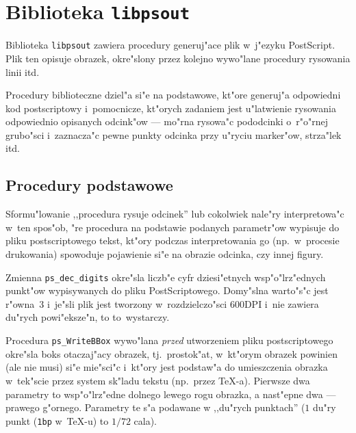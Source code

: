 

\chapter{Biblioteka \texttt{libpsout}}

Biblioteka \texttt{libpsout} zawiera procedury generuj"ace plik
w~j"ezyku PostScript\raisebox{3pt}{\tiny(TM)}. Plik ten opisuje
obrazek, okre"slony przez kolejno wywo"lane procedury rysowania linii itd.

Procedury biblioteczne dziel"a si"e na podstawowe, kt"ore generuj"a
odpowiedni kod postscriptowy i~pomocnicze, kt"orych zadaniem jest u"latwienie
rysowania odpowiednio opisanych odcink"ow --- mo"rna rysowa"c pododcinki
o~r"o"rnej grubo"sci i~zaznacza"c pewne punkty odcinka przy u"ryciu
marker"ow, strza"lek itd.


\section{Procedury podstawowe}

Sformu"lowanie ,,procedura rysuje odcinek'' lub cokolwiek nale"ry
interpretowa"c w~ten spos"ob, "re procedura na podstawie podanych
parametr"ow wypisuje do pliku postscriptowego tekst, kt"ory podczas
interpretowania go (np.\ w~procesie drukowania) spowoduje pojawienie si"e na
obrazie odcinka, czy innej figury.

\vspace{\bigskipamount}
Zmienna \texttt{ps\_dec\_digits} okre"sla liczb"e cyfr
dziesi"etnych wsp"o"lrz"ednych punkt"ow wypisywanych do pliku
PostScriptowego. Domy"slna warto"s"c jest r"owna~$3$ i~je"sli plik jest
tworzony w~rozdzielczo"sci $600$DPI i~nie zawiera du"rych powi"eksze"n, to
to~wystarczy.

\vspace{\bigskipamount}
Procedura \texttt{ps\_WriteBBox} wywo"lana \emph{przed} utworzeniem pliku
postscriptowego okre"sla boks otaczaj"acy obrazek, tj.\ prostok"at,
w~kt"orym obrazek powinien (ale nie musi) si"e mie"sci"c i~kt"ory jest
podstaw"a do umieszczenia obrazka w~tek"scie przez system sk"ladu tekstu
(np.\ przez \TeX-a). Pierwsze dwa parametry to wsp"o"lrz"edne dolnego
lewego rogu obrazka, a nast"epne dwa --- prawego g"ornego. Parametry te s"a
podawane w ,,du"rych punktach'' ($1$ du"ry punkt (\texttt{1bp} w~\TeX-u) to
$1/72$ cala).

